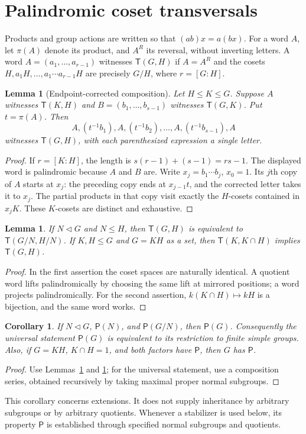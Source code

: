 \documentclass[11pt]{article}
\newtheorem{lemma}[theorem]{Lemma}
\newtheorem{corollary}[theorem]{Corollary}
\theoremstyle{definition}
\newcommand{\Pp}{\mathsf P}
\newcommand{\Tt}{\mathsf T}
\begin{document}
\section{Palindromic coset transversals}\label{sec:cosets}
Products and group actions are written so that $(ab)x=a(bx)$. For a word $A$, let $\pi(A)$ denote its product, and $A^R$ its reversal, without inverting letters. A word $A=(a_1,\ldots,a_{r-1})$ witnesses $\Tt(G,H)$ if $A=A^R$ and the cosets $H,a_1H,\ldots,a_1\cdots a_{r-1}H$ are precisely $G/H$, where $r=[G:H]$.
\begin{lemma}[Endpoint-corrected composition]\label{lem:splice}
Let $H\le K\le G$. Suppose $A$ witnesses $\Tt(K,H)$ and $B=(b_1,\ldots,b_{s-1})$ witnesses $\Tt(G,K)$. Put $t=\pi(A)$. Then
\[
A,(t^{-1}b_1),A,(t^{-1}b_2),\ldots,A,(t^{-1}b_{s-1}),A
\]
witnesses $\Tt(G,H)$, with each parenthesized expression a single letter.
\end{lemma}
\begin{proof}
If $r=[K:H]$, the length is $s(r-1)+(s-1)=rs-1$. The displayed word is palindromic because $A$ and $B$ are. Write $x_j=b_1\cdots b_j$, $x_0=1$. Its $j$th copy of $A$ starts at $x_j$: the preceding copy ends at $x_{j-1}t$, and the corrected letter takes it to $x_j$. The partial products in that copy visit exactly the $H$-cosets contained in $x_jK$. These $K$-cosets are distinct and exhaustive.
\end{proof}
\begin{lemma}\label{lem:transfer}
If $N\lhd G$ and $N\le H$, then $\Tt(G,H)$ is equivalent to $\Tt(G/N,H/N)$. If $K,H\le G$ and $G=KH$ as a set, then $\Tt(K,K\cap H)$ implies $\Tt(G,H)$.
\end{lemma}
\begin{proof}
In the first assertion the coset spaces are naturally identical. A quotient word lifts palindromically by choosing the same lift at mirrored positions; a word projects palindromically. For the second assertion, $k(K\cap H)\mapsto kH$ is a bijection, and the same word works.
\end{proof}
\begin{corollary}\label{cor:extension}
If $N\lhd G$, $\Pp(N)$, and $\Pp(G/N)$, then $\Pp(G)$. Consequently the universal statement $\Pp(G)$ is equivalent to its restriction to finite simple groups. Also, if $G=KH$, $K\cap H=1$, and both factors have $\Pp$, then $G$ has $\Pp$.
\end{corollary}
\begin{proof}
Use Lemmas~\ref{lem:splice} and \ref{lem:transfer}; for the universal statement, use a composition series, obtained recursively by taking maximal proper normal subgroups.
\end{proof}
This corollary concerns extensions. It does not supply inheritance by arbitrary subgroups or by arbitrary quotients. Whenever a stabilizer is used below, its property $\Pp$ is established through specified normal subgroups and quotients.
\end{document}
